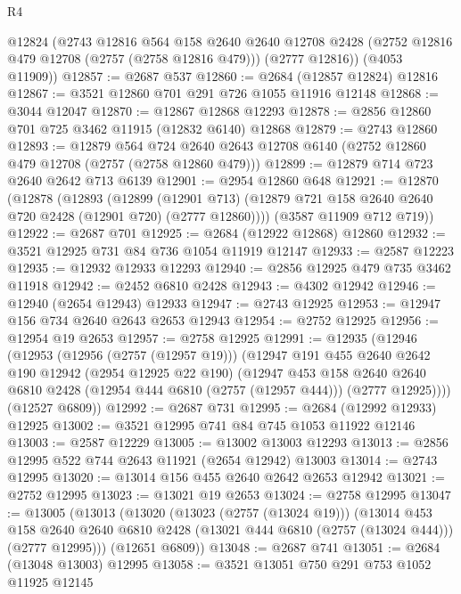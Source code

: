 \begin{lexlean}{R4}
\begin{coremodule}
      @12824
      (@2743
        @12816
        @564
        @158
        @2640
        @2640
        @12708
        @2428
        (@2752 @12816 @479 @12708 (@2757 (@2758 @12816 @479)))
        (@2777 @12816))
      (@4053 @11909))
@12857 := @2687 @537
@12860 := @2684 (@12857 @12824) @12816
@12867 := @3521 @12860 @701 @291 @726 @1055 @11916 @12148
@12868 := @3044 @12047
@12870 := @12867 @12868 @12293
@12878 := @2856 @12860 @701 @725 @3462 @11915 (@12832 @6140) @12868
@12879 := @2743 @12860
@12893 := @12879
    @564
    @724
    @2640
    @2643
    @12708
    @6140
    (@2752 @12860 @479 @12708 (@2757 (@2758 @12860 @479)))
@12899 := @12879 @714 @723 @2640 @2642 @713 @6139
@12901 := @2954 @12860 @648
@12921 := @12870
    (@12878
      (@12893
        (@12899
          (@12901 @713)
          (@12879 @721 @158 @2640 @2640 @720 @2428 (@12901 @720) (@2777 @12860))))
      (@3587 @11909 @712 @719))
@12922 := @2687 @701
@12925 := @2684 (@12922 @12868) @12860
@12932 := @3521 @12925 @731 @84 @736 @1054 @11919 @12147
@12933 := @2587 @12223
@12935 := @12932 @12933 @12293
@12940 := @2856 @12925 @479 @735 @3462 @11918
@12942 := @2452 @6810 @2428
@12943 := @4302 @12942
@12946 := @12940 (@2654 @12943) @12933
@12947 := @2743 @12925
@12953 := @12947 @156 @734 @2640 @2643 @2653 @12943
@12954 := @2752 @12925
@12956 := @12954 @19 @2653
@12957 := @2758 @12925
@12991 := @12935
    (@12946
      (@12953
        (@12956 (@2757 (@12957 @19)))
        (@12947
          @191
          @455
          @2640
          @2642
          @190
          @12942
          (@2954 @12925 @22 @190)
          (@12947
            @453
            @158
            @2640
            @2640
            @6810
            @2428
            (@12954 @444 @6810 (@2757 (@12957 @444)))
            (@2777 @12925))))
      (@12527 @6809))
@12992 := @2687 @731
@12995 := @2684 (@12992 @12933) @12925
@13002 := @3521 @12995 @741 @84 @745 @1053 @11922 @12146
@13003 := @2587 @12229
@13005 := @13002 @13003 @12293
@13013 := @2856 @12995 @522 @744 @2643 @11921 (@2654 @12942) @13003
@13014 := @2743 @12995
@13020 := @13014 @156 @455 @2640 @2642 @2653 @12942
@13021 := @2752 @12995
@13023 := @13021 @19 @2653
@13024 := @2758 @12995
@13047 := @13005
    (@13013
      (@13020
        (@13023 (@2757 (@13024 @19)))
        (@13014
          @453
          @158
          @2640
          @2640
          @6810
          @2428
          (@13021 @444 @6810 (@2757 (@13024 @444)))
          (@2777 @12995)))
      (@12651 @6809))
@13048 := @2687 @741
@13051 := @2684 (@13048 @13003) @12995
@13058 := @3521 @13051 @750 @291 @753 @1052 @11925 @12145

\end{coremodule}
\end{lexlean}
